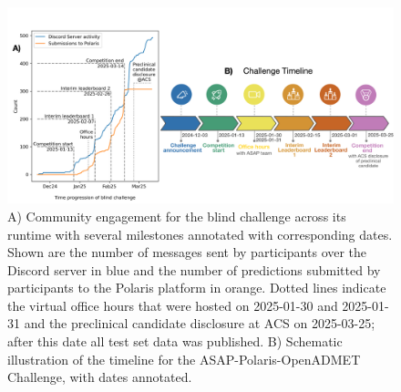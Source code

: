 \documentclass[journal=jcim,manuscript=article]{achemso}
\begin{document}
\begin{figure}
    \includegraphics[scale=0.58]{02_figs_community/community_progress_and_timeline.png}
  \caption{A) Community engagement for the blind challenge across its runtime with several milestones annotated with corresponding dates. Shown are the number of messages sent by participants over the Discord server in blue and the number of predictions submitted by participants to the Polaris platform in orange. Dotted lines indicate the virtual office hours that were hosted on 2025-01-30 and 2025-01-31 and the preclinical candidate disclosure at ACS on 2025-03-25; after this date all test set data was published. B) Schematic illustration of the timeline for the ASAP-Polaris-OpenADMET Challenge, with dates annotated.}
  \label{fgr:timeline_engagement}
\end{figure}
\end{document}
